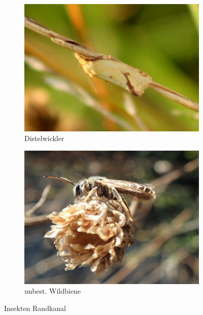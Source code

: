 \documentclass[10pt]{article}
\begin{document}
\begin{figure}[h!]
\begin{subfigure}[b]{0.45\linewidth}
    \includegraphics[width=\linewidth]{img/randkanal/distelwickler.jpg}
    \caption{Distelwickler}
  \end{subfigure}
  \begin{subfigure}[b]{0.43\linewidth}
    \includegraphics[width=\linewidth]{img/randkanal/wildbiene.jpg}
    \caption{unbest. Wildbiene}
  \end{subfigure}
  \caption{Insekten Randkanal}
\end{figure}

\clearpage
\end{document}
